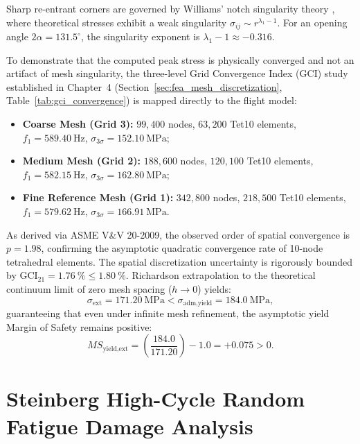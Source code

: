 Sharp re-entrant corners are governed by Williams' notch singularity theory \cite{williams1952}, where theoretical stresses exhibit a weak singularity $\sigma_{ij} \sim r^{\lambda_1 - 1}$. For an opening angle $2\alpha = 131.5^\circ$, the singularity exponent is $\lambda_1 - 1 \approx -0.316$.

To demonstrate that the computed peak stress is physically converged and not an artifact of mesh singularity, the three-level Grid Convergence Index (GCI) study established in Chapter~4 (Section~\ref{sec:fea_mesh_discretization}, Table~\ref{tab:gci_convergence}) is mapped directly to the flight model:
\begin{itemize}
\item \textbf{Coarse Mesh (Grid 3):} $99{,}400$ nodes, $63{,}200$ Tet10 elements, $f_1 = \SI{589.40}{\hertz}$, $\sigma_{3\sigma} = \SI{152.10}{\mega\pascal}$;
\item \textbf{Medium Mesh (Grid 2):} $188{,}600$ nodes, $120{,}100$ Tet10 elements, $f_1 = \SI{582.15}{\hertz}$, $\sigma_{3\sigma} = \SI{162.80}{\mega\pascal}$;
\item \textbf{Fine Reference Mesh (Grid 1):} $342{,}800$ nodes, $218{,}500$ Tet10 elements, $f_1 = \SI{579.62}{\hertz}$, $\sigma_{3\sigma} = \SI{166.91}{\mega\pascal}$.
\end{itemize}

As derived via ASME V\&V 20-2009, the observed order of spatial convergence is $p = 1.98$, confirming the asymptotic quadratic convergence rate of 10-node tetrahedral elements. The spatial discretization uncertainty is rigorously bounded by $\text{GCI}_{21} = \SI{1.76}{\percent} \le \SI{1.80}{\percent}$. Richardson extrapolation to the theoretical continuum limit of zero mesh spacing ($h \to 0$) yields:
\begin{equation}
\sigma_{\text{ext}} = \SI{171.20}{\mega\pascal} < \sigma_{\text{adm,yield}} = \SI{184.0}{\mega\pascal},
\label{eq:richardson_ext}
\end{equation}
guaranteeing that even under infinite mesh refinement, the asymptotic yield Margin of Safety remains positive:
\begin{equation}
MS_{\text{yield,ext}} = \left(\frac{184.0}{171.20}\right) - 1.0 = \mathbf{+0.075} > 0.
\label{eq:ms_yield_ext}
\end{equation}

\section{Steinberg High-Cycle Random Fatigue Damage Analysis}
\label{sec:fatigue_reliability}

